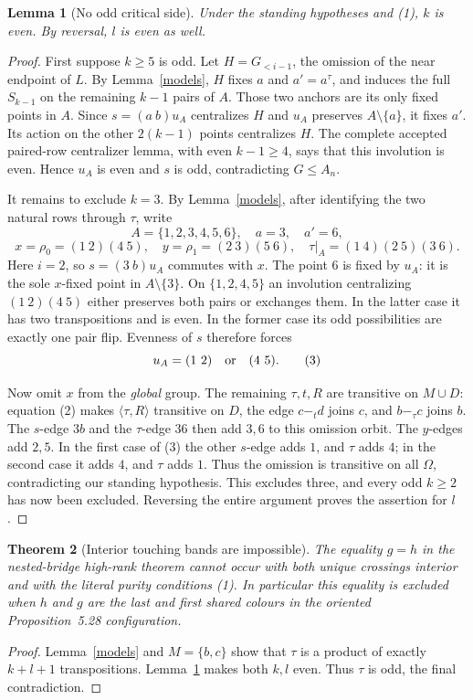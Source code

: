 \documentclass[11pt,a4paper]{article}
\newtheorem{lemma}{Lemma}
\newtheorem{theorem}[lemma]{Theorem}
\newcommand{\gen}[1]{\langle#1\rangle}
\begin{document}
\begin{lemma}[No odd critical side]\label{odd}
Under the standing hypotheses and (1), $k$ is even. By reversal,
$l$ is even as well.
\end{lemma}
\begin{proof}
First suppose $k\geq5$ is odd. Let $H=G_{<i-1}$, the omission
of the near endpoint of $L$. By Lemma~\ref{models}, $H$ fixes
$a$ and $a'=a^\tau$, and induces the full $S_{k-1}$ on the
remaining $k-1$ pairs of $A$. Those two anchors are its only
fixed points in $A$. Since $s=(a\ b)u_A$ centralizes $H$ and
$u_A$ preserves $A\setminus\{a\}$, it fixes $a'$. Its action
on the other $2(k-1)$ points centralizes $H$. The complete
accepted paired-row centralizer lemma, with even $k-1\geq4$,
says that this involution is even. Hence $u_A$ is even and
$s$ is odd, contradicting $G\leq A_n$.

It remains to exclude $k=3$. By Lemma~\ref{models}, after
identifying the two natural rows through $\tau$, write
\[
 A=\{1,2,3,4,5,6\},\quad a=3,\quad a'=6,
\]
\[
 x=\rho_0=(1\ 2)(4\ 5),\quad
 y=\rho_1=(2\ 3)(5\ 6),\quad
 \tau|_A=(1\ 4)(2\ 5)(3\ 6).
\]
Here $i=2$, so $s=(3\ b)u_A$ commutes with $x$. The point
$6$ is fixed by $u_A$: it is the sole $x$-fixed point in
$A\setminus\{3\}$. On $\{1,2,4,5\}$ an involution
centralizing $(1\ 2)(4\ 5)$ either preserves both pairs or
exchanges them. In the latter case it has two transpositions
and is even. In the former case its odd possibilities are
exactly one pair flip. Evenness of $s$ therefore forces
\[
                    u_A=(1\ 2)\quad\hbox{or}\quad(4\ 5).       \tag{3}
\]

Now omit $x$ from the \emph{global} group. The remaining
$\tau,t,R$ are transitive on $M\cup D$: equation (2) makes
$\gen{\tau,R}$ transitive on $D$, the edge $c\mathrel{-_t}d$
joins $c$, and $b\mathrel{-_\tau}c$ joins $b$.
The $s$-edge $3b$ and the $\tau$-edge $36$ then add $3,6$
to this omission orbit. The $y$-edges add $2,5$. In the first
case of (3) the other $s$-edge adds $1$, and $\tau$ adds $4$;
in the second case it adds $4$, and $\tau$ adds $1$.
Thus the omission is transitive on all $\Omega$, contradicting
our standing hypothesis. This excludes three, and every odd
$k\geq2$ has now been excluded. Reversing the entire argument
proves the assertion for $l$.
\end{proof}

\begin{theorem}[Interior touching bands are impossible]
The equality $g=h$ in the nested-bridge high-rank theorem cannot
occur with both unique crossings interior and with the literal
purity conditions (1). In particular this equality is excluded
when $h$ and $g$ are the last and first shared colours in the
oriented Proposition~5.28 configuration.
\end{theorem}
\begin{proof}
Lemma~\ref{models} and $M=\{b,c\}$ show that $\tau$ is a
product of exactly $k+l+1$ transpositions. Lemma~\ref{odd}
makes both $k,l$ even. Thus $\tau$ is odd, the final contradiction.
\end{proof}
\end{document}
